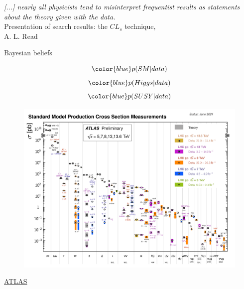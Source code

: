 \documentclass[
aspectratio=169,
14pt,
professionalfonts
]{beamer}
\begin{document}
\begin{frame}
    \textit{ [...] nearly all physicists tend to misinterpret frequentist results as statements about the theory given with the data.}\\
    \flushright Presentation of search results: the $CL_s$ technique,\\ A. L. Read
\end{frame}

\begin{frame}{Bayesian beliefs}
    \begin{minipage}{0.44\textwidth}
        $$\color{blue} p(SM|data)$$
        $$\color{blue} p(Higgs|data)$$
        $$\color{blue} p(SUSY|data)$$
    \end{minipage}
    \begin{minipage}{0.55\textwidth}
        \begin{figure}
            \centering
            \includegraphics[width=\textwidth]{../plots/sm_pred.png}
        \end{figure}
        \small \flushright
        \href{https://atlas.web.cern.ch/Atlas/GROUPS/PHYSICS/PUBNOTES/ATL-PHYS-PUB-2024-011/fig_03a.png}{ATLAS}
    \end{minipage}
\end{frame}
\end{document}
